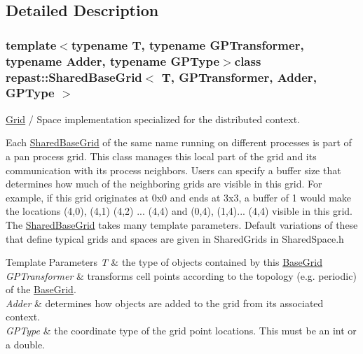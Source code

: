 \subsection{Detailed Description}
\subsubsection*{template$<$typename T, typename G\-P\-Transformer, typename Adder, typename G\-P\-Type$>$class repast\-::\-Shared\-Base\-Grid$<$ T, G\-P\-Transformer, Adder, G\-P\-Type $>$}

\hyperlink{classrepast_1_1_grid}{Grid} / Space implementation specialized for the distributed context. 

Each \hyperlink{classrepast_1_1_shared_base_grid}{Shared\-Base\-Grid} of the same name running on different processes is part of a pan process grid. This class manages this local part of the grid and its communication with its process neighbors. Users can specify a buffer size that determines how much of the neighboring grids are visible in this grid. For example, if this grid originates at 0x0 and ends at 3x3, a buffer of 1 would make the locations (4,0), (4,1) (4,2) ... (4,4) and (0,4), (1,4)... (4,4) visible in this grid. The \hyperlink{classrepast_1_1_shared_base_grid}{Shared\-Base\-Grid} takes many template parameters. Default variations of these that define typical grids and spaces are given in Shared\-Grids in Shared\-Space.\-h


\begin{DoxyTemplParams}{Template Parameters}
{\em T} & the type of objects contained by this \hyperlink{classrepast_1_1_base_grid}{Base\-Grid} \\
\hline
{\em G\-P\-Transformer} & transforms cell points according to the topology (e.\-g. periodic) of the \hyperlink{classrepast_1_1_base_grid}{Base\-Grid}. \\
\hline
{\em Adder} & determines how objects are added to the grid from its associated context. \\
\hline
{\em G\-P\-Type} & the coordinate type of the grid point locations. This must be an int or a double. \\
\hline
\end{DoxyTemplParams}


